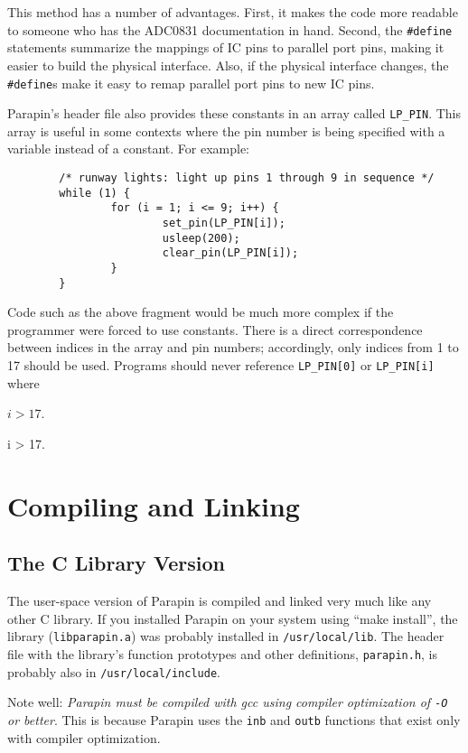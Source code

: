 \documentclass{article}
\begin{document}
This method has a number of advantages.  First, it makes the code more
readable to someone who has the ADC0831 documentation in hand.
Second, the {\tt \#define} statements summarize the mappings of IC
pins to parallel port pins, making it easier to build the physical
interface.  Also, if the physical interface changes, the {\tt
\#define}s make it easy to remap parallel port pins to new IC pins.

Parapin's header file also provides these constants in an array called
{\tt LP\_PIN}.  This array is useful in some contexts where the pin
number is being specified with a variable instead of a constant.  For
example:
\begin{verbatim}
        /* runway lights: light up pins 1 through 9 in sequence */
        while (1) {
                for (i = 1; i <= 9; i++) {
                        set_pin(LP_PIN[i]);
                        usleep(200);
                        clear_pin(LP_PIN[i]);
                }
        }
\end{verbatim}

Code such as the above fragment would be much more complex if the
programmer were forced to use constants.  There is a direct
correspondence between indices in the array and pin numbers;
accordingly, only indices from 1 to 17 should be used.  Programs
should never reference \verb|LP_PIN[0]| or \verb|LP_PIN[i]| where
\begin{latexonly}$i > 17$.\end{latexonly}
\begin{htmlonly}i > 17.\end{htmlonly}


\section{Compiling and Linking}
\label{compiling}
\subsection{The C Library Version}

The user-space version of Parapin is compiled and linked very much
like any other C library.  If you installed Parapin on your system
using ``make install'', the library ({\tt libparapin.a}) was probably
installed in {\tt /usr/local/lib}.  The header file with the library's
function prototypes and other definitions, {\tt parapin.h}, is
probably also in {\tt /usr/local/include}.

Note well: {\em Parapin must be compiled with gcc using compiler
optimization of {\tt -O} or better}.  This is because Parapin uses the
{\tt inb} and {\tt outb} functions that exist only with compiler
optimization.
\end{document}
